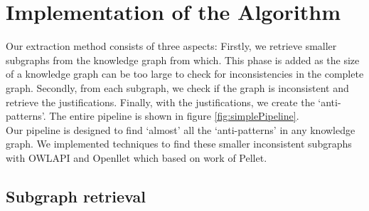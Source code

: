 \documentclass[11pt,letterpaper ,oneside ]{book}
\begin{document}
	\section{Implementation of the Algorithm}
	Our extraction method consists of three aspects: Firstly, we retrieve smaller subgraphs from the knowledge graph from which. This phase is added as the size of a knowledge graph can be too large to check for inconsistencies in the complete graph. Secondly, from each subgraph, we check if the graph is inconsistent and retrieve the justifications. Finally, with the justifications, we create the `anti-patterns'. The entire pipeline is shown in figure \ref{fig:simplePipeline}.\\
	Our pipeline is designed to find `almost' all the `anti-patterns' in any knowledge graph. We implemented techniques to find these smaller inconsistent subgraphs with OWLAPI\cite{Horridge:2011} and Openllet\cite{Openllet:2019} which based on work of Pellet\cite{Pellet:2007}.\\
	
	\subsection{Subgraph retrieval}
	\begin{figure}[!t]
	\end{figure}
	
\end{document}
